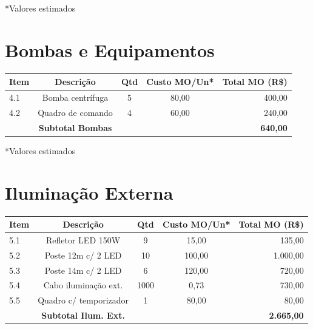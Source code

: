 \documentclass[12pt,a4paper]{article}
\renewenvironment{table}%
{\begin{center}%
\scriptsize%
\addtolength{\tabcolsep}{-2pt}%
}%
{\end{center}}
\begin{document}
\noindent\small{*Valores estimados}

\section{Bombas e Equipamentos}

\begin{table}
\centering
\begin{tabular}{lcccr}
\toprule
\textbf{Item} & \textbf{Descrição} & \textbf{Qtd} & \textbf{Custo MO/Un*} & \textbf{Total MO (R\$)} \\
\midrule
4.1 & Bomba centrífuga & 5 & 80,00 & 400,00 \\
4.2 & Quadro de comando & 4 & 60,00 & 240,00 \\
\midrule
 & \textbf{Subtotal Bombas} & & & \textbf{640,00} \\
\bottomrule
\end{tabular}
\end{table}

\noindent\small{*Valores estimados}

\section{Iluminação Externa}

\begin{table}
\centering
\begin{tabular}{lcccr}
\toprule
\textbf{Item} & \textbf{Descrição} & \textbf{Qtd} & \textbf{Custo MO/Un*} & \textbf{Total MO (R\$)} \\
\midrule
5.1 & Refletor LED 150W & 9 & 15,00 & 135,00 \\
5.2 & Poste 12m c/ 2 LED & 10 & 100,00 & 1.000,00 \\
5.3 & Poste 14m c/ 2 LED & 6 & 120,00 & 720,00 \\
5.4 & Cabo iluminação ext. & 1000 & 0,73 & 730,00 \\
5.5 & Quadro c/ temporizador & 1 & 80,00 & 80,00 \\
\midrule
 & \textbf{Subtotal Ilum. Ext.} & & & \textbf{2.665,00} \\
\bottomrule
\end{tabular}
\end{table}
\end{document}
